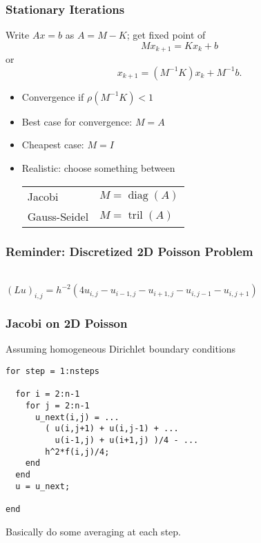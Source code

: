 \documentclass{beamer}
\begin{document}
\begin{frame}
  \frametitle{Stationary Iterations}

  Write $Ax = b$ as $A = M-K$; get fixed point of
  \[
    M x_{k+1} = K x_k + b
  \]
  or
  \[
    x_{k+1} = (M^{-1} K) x_k + M^{-1} b.
  \]

  \vspace{5mm}
  \begin{itemize}
  \item Convergence if $\rho(M^{-1} K) < 1$
  \item Best case for convergence: $M = A$
  \item Cheapest case: $M = I$
  \item Realistic: choose something between \\ \vspace{1mm}
    \begin{tabular}{ll}
      Jacobi & $M = \operatorname{diag}(A)$ \\
      Gauss-Seidel & $M = \operatorname{tril}(A)$
    \end{tabular}
  \end{itemize}
\end{frame}


\begin{frame}
  \frametitle{Reminder: Discretized 2D Poisson Problem}

  \begin{center}
     \\
  \vspace{10mm}
  $
    (Lu)_{i,j} = h^{-2} \left( 4u_{i,j}-u_{i-1,j}-u_{i+1,j}-u_{i,j-1}-u_{i,j+1} \right)
  $
  \end{center}

\end{frame}


\begin{frame}[fragile]
  \frametitle{Jacobi on 2D Poisson}

Assuming homogeneous Dirichlet boundary conditions 
\begin{lstlisting}
for step = 1:nsteps

  for i = 2:n-1
    for j = 2:n-1
      u_next(i,j) = ...
        ( u(i,j+1) + u(i,j-1) + ...
          u(i-1,j) + u(i+1,j) )/4 - ...
        h^2*f(i,j)/4;
    end
  end
  u = u_next;

end
\end{lstlisting}
Basically do some averaging at each step.

\end{frame}
\end{document}
